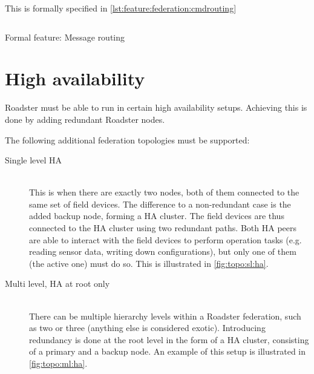 This is formally specified in \autoref{lst:feature:federation:cmdrouting}

\begin{listing}
	\inputminted{Gherkin}{listings/features/federation/message_routing.feature}
	\caption{Formal feature: Message routing}
	\label{lst:feature:federation:cmdrouting}
\end{listing}

\section{High availability}
Roadster must be able to run in certain high availability setups. Achieving
this is done by adding redundant Roadster nodes.

The following additional federation topologies must be supported:
\begin{description}
	\item [ Single level \gls{HA} ] \hfill\\
		This is when there are exactly two nodes, both of them
		connected to the same set of field devices. The difference to a
		non-redundant case is the added backup node, forming a HA
		cluster. The field devices are thus connected to the HA cluster
		using two redundant paths. Both HA peers are able to interact
		with the field devices to perform operation tasks (e.g. reading
		sensor data, writing down configurations), but only one of them
		(the active one) must do so. This is illustrated in
		\autoref{fig:topo:sl:ha}.

	\item [ Multi level, \gls{HA} at root only ] \hfill\\
		There can be multiple hierarchy levels within a Roadster federation, such as two or
		three (anything else is considered exotic). Introducing
		redundancy is done at the root level in the form of a HA
		cluster, consisting of a primary and a backup node. An example of this setup is illustrated in
		\autoref{fig:topo:ml:ha}.
\end{description}

